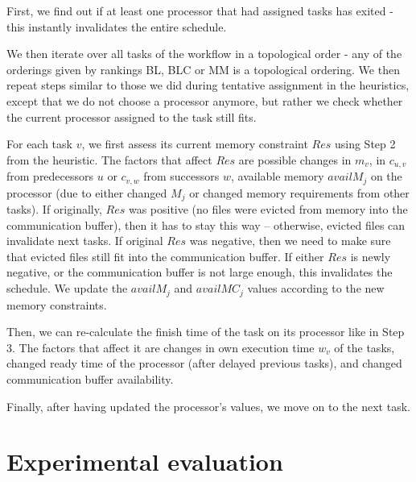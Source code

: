 \documentclass[conference]{IEEEtran}
\newcommand{\skug}[1]{{\color{blue}[SK: #1]}}
\newcommand{\hmey}[1]{{\color{red}[HM: #1]}}
\begin{document}
    First, we find out if at least one processor that had assigned tasks has exited - this instantly invalidates the
    entire schedule.

    We then iterate over all tasks of the workflow in a topological order - any of the orderings given by rankings BL, BLC or MM
    is a topological ordering.
    We then repeat steps similar to those we did during tentative assignment in the heuristics, 
    except that we do not choose a processor
    anymore, but rather we check whether the current processor assigned to the task still fits.

    For each task $v$, we first assess its current memory constraint $Res$ using Step 2 from the heuristic.
    The factors that affect $Res$ are possible changes in $m_v$, in $c_{u,v}$ from predecessors $u$ 
    or $c_{v,w}$ from successors $w$,
    available memory $availM_j$ on the processor (due to either changed $M_j$ or changed memory requirements 
    from other tasks).
    If originally, $Res$ was positive (no files were evicted from memory into the communication buffer), 
    then it has to stay this way --
    otherwise, evicted files can invalidate next tasks.
    If original $Res$ was negative, then we need to make sure that evicted files still fit into the communication buffer.
    If either $Res$ is newly negative, or the communication buffer is not large enough, this invalidates the schedule.
    We update the $availM_j$ and $availMC_j$ values according to the new memory constraints.

    Then, we can re-calculate the finish time of the task on its processor like in Step 3.
    The factors that affect it are changes in own execution time $w_v$ of the tasks, changed ready time of the processor
    (after delayed previous tasks), and changed communication buffer availability.

    Finally, after having updated the processor's values, we move on to the next task.





\section{Experimental evaluation} %
\label{sec:expe}
\end{document}
